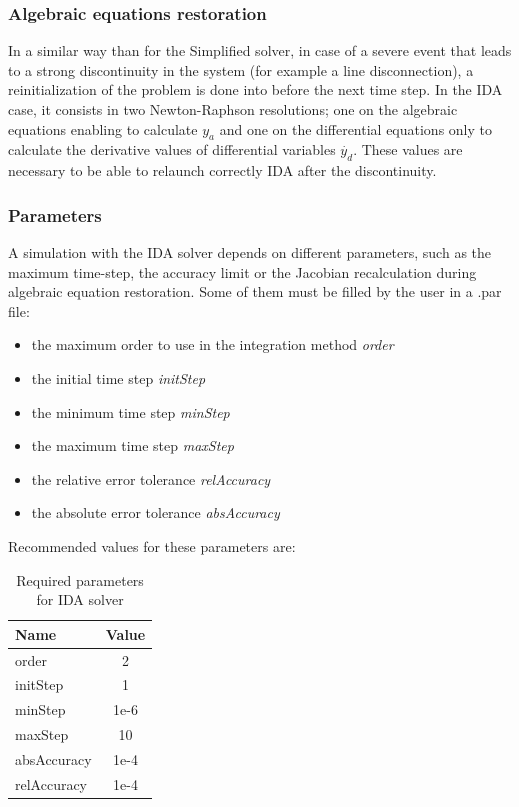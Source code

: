 \documentclass[a4paper, 12pt]{report}
\begin{document}
\subsubsection{Algebraic equations restoration}

In a similar way than for the Simplified solver, in case of a severe event that leads to a strong discontinuity in the system (for example a line disconnection), a reinitialization of the problem is done into \Dynawo before the next time step.
In the \ac{IDA} case, it consists in two Newton-Raphson resolutions; one on the algebraic equations enabling to calculate $y_a$ and one on the differential equations only to calculate the derivative values of differential variables $\dot{y_d}$. These values are necessary to be able to relaunch correctly \ac{IDA} after the discontinuity.

\subsubsection{Parameters}

A simulation with the \ac{IDA} solver depends on different parameters, such as the maximum time-step, the accuracy limit or the Jacobian recalculation during algebraic equation restoration. Some of them must be filled by the user in a .par file:
\begin{itemize}
\item the maximum order to use in the integration method \textit{order}
\item the initial time step \textit{initStep}
\item the minimum time step \textit{minStep}
\item the maximum time step \textit{maxStep}
\item the relative error tolerance \textit{relAccuracy}
\item the absolute error tolerance \textit{absAccuracy}
\end{itemize}

Recommended values for these parameters are:
\begin{table}[h!]
\center
\begin{tabular}{ l | c }
\toprule
\textbf{{Name}} & \textbf{{Value}} \\
\midrule
order & 2 \\
initStep & 1 \\
minStep & 1e-6 \\
maxStep & 10 \\
absAccuracy & 1e-4 \\
relAccuracy & 1e-4 \\
\bottomrule
\end{tabular}
\caption{Required parameters for \ac{IDA} solver}
\end{table}
\end{document}
